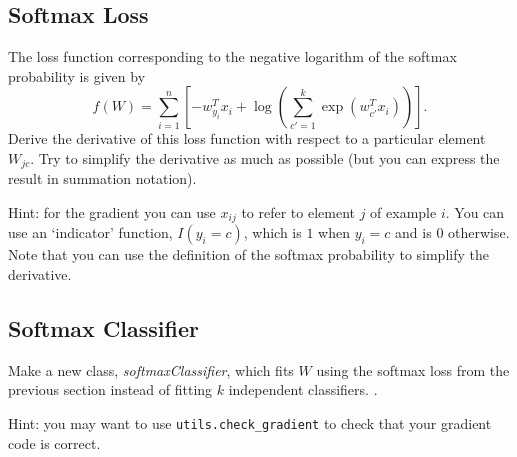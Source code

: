 \documentclass{article}
\begin{document}
\subsection{Softmax Loss}

The loss function corresponding to the negative logarithm of the softmax probability is given by
\[
f(W) = \sum_{i=1}^n \left[-w_{y_i}^Tx_i + \log\left(\sum_{c' = 1}^k \exp(w_{c'}^Tx_i)\right)\right].
\]
Derive the derivative of this loss function with respect to a particular element $W_{jc}$. Try to simplify the derivative as much as possible (but you can express the result in summation notation).

Hint: for the gradient you can use $x_{ij}$ to refer to element $j$ of example $i$. You can use an `indicator' function, $I(y_i = c)$, which is $1$ when $y_i = c$ and is $0$ otherwise. Note that you can use the definition of the softmax probability to simplify the derivative.


\subsection{Softmax Classifier}

Make a new class, \emph{softmaxClassifier}, which fits $W$ using the softmax loss from the previous section  instead of fitting $k$ independent classifiers. .

Hint: you may want to use \verb|utils.check_gradient| to check that your gradient code is correct.
\end{document}
